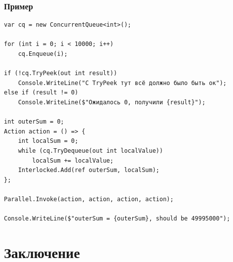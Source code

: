 \documentclass{../../slides-style}
\begin{document}
    \begin{frame}[fragile]
        \frametitle{Пример}
        \begin{scriptsize}
            \begin{verbatim}
var cq = new ConcurrentQueue<int>();

for (int i = 0; i < 10000; i++) 
    cq.Enqueue(i);

if (!cq.TryPeek(out int result))
    Console.WriteLine("С TryPeek тут всё должно было быть ок");
else if (result != 0)
    Console.WriteLine($"Ожидалось 0, получили {result}");

int outerSum = 0;
Action action = () => {
    int localSum = 0;
    while (cq.TryDequeue(out int localValue)) 
        localSum += localValue;
    Interlocked.Add(ref outerSum, localSum);
};

Parallel.Invoke(action, action, action, action);

Console.WriteLine($"outerSum = {outerSum}, should be 49995000");
            \end{verbatim}
        \end{scriptsize}
    \end{frame}

    \section{Заключение}
\end{document}
